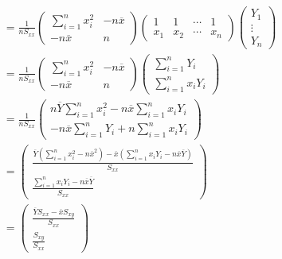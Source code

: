 \begin{exemple}
\begin{align*}
        &= \frac{1}{nS_{xx}} \begin{pmatrix}
            \sum\limits_{i=1}^n x_i^2 & -n\overline{x}\\
            -n\overline{x} & n 
            \end{pmatrix}
            \begin{pmatrix}
                1 & 1 & \cdots & 1   \\
                x_1 & x_{2} & \cdots & x_n  
            \end{pmatrix}
            \begin{pmatrix}
                Y_1 \\ \vdots \\ Y_n
            \end{pmatrix} \\
        &= \frac{1}{nS_{xx}} \begin{pmatrix}
            \sum\limits_{i=1}^n x_i^2 & -n\overline{x}\\
            -n\overline{x} & n 
            \end{pmatrix}
            \begin{pmatrix}
                \sum\limits_{i=1}^n Y_i \\[4mm]
                \sum\limits_{i=1}^n x_iY_i 
            \end{pmatrix} \\
        &= \frac{1}{nS_{xx}} \begin{pmatrix}
            n\overline{Y}\sum\limits_{i=1}^n x_i^2  - n\overline{x} \sum\limits_{i=1}^n x_i Y_i \\[4mm]
            -n\overline{x}\sum\limits_{i=1}^n Y_i  + n \sum\limits_{i=1}^n x_i Y_i
        \end{pmatrix} \\
        &= \begin{pmatrix}
        \frac{\displaystyle\overline Y\left( \sum\limits_{i=1}^n x_i^2-n\overline x^2\right)-\overline x\left(\sum\limits_{i=1}^n  x_i Y_i-n\overline x\overline Y\right)}{\displaystyle S_{xx}} \\
            \frac{\displaystyle  \sum\limits_{i=1}^n x_i Y_i - n\overline{x} \overline{Y}}{\displaystyle S_{xx}} 
        \end{pmatrix} \\
        &= \begin{pmatrix}
        \frac{\displaystyle \overline{Y}S_{xx} - \overline{x}S_{xy}}{\displaystyle S_{xx}} \\
            \frac{\displaystyle S_{xy}}{\displaystyle S_{xx}}

\end{pmatrix}
\end{align*}
\end{exemple}
